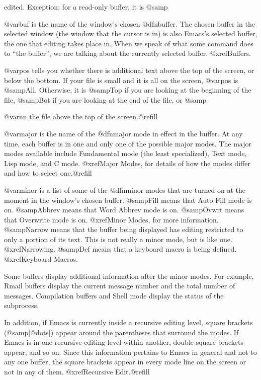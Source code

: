 edited.  Exception: for a read-only buffer, it is @samp{%

  @var{buf} is the name of the window's chosen @dfn{buffer}.  The chosen buffer
in the selected window (the window that the cursor is in) is also Emacs's
selected buffer, the one that editing takes place in.  When we speak of
what some command does to ``the buffer'', we are talking about the
currently selected buffer.  @xref{Buffers}.

  @var{pos} tells you whether there is additional text above the top of the
screen, or below the bottom.  If your file is small and it is all on the
screen, @var{pos} is @samp{All}.  Otherwise, it is @samp{Top} if you are
looking at the beginning of the file, @samp{Bot} if you are looking at the
end of the file, or @samp{@var{nn}%
the file above the top of the screen.@refill

  @var{major} is the name of the @dfn{major mode} in effect in the buffer.  At
any time, each buffer is in one and only one of the possible major modes.
The major modes available include Fundamental mode (the least specialized),
Text mode, Lisp mode, and C mode.  @xref{Major Modes}, for details
of how the modes differ and how to select one.@refill

  @var{minor} is a list of some of the @dfn{minor modes} that are turned on
at the moment in the window's chosen buffer.  @samp{Fill} means that Auto
Fill mode is on.  @samp{Abbrev} means that Word Abbrev mode is on.
@samp{Ovwrt} means that Overwrite mode is on.  @xref{Minor Modes}, for more
information.  @samp{Narrow} means that the buffer being displayed has
editing restricted to only a portion of its text.  This is not really a
minor mode, but is like one.  @xref{Narrowing}.  @samp{Def} means that a
keyboard macro is being defined.  @xref{Keyboard Macros}.

  Some buffers display additional information after the minor modes.  For
example, Rmail buffers display the current message number and the total
number of messages.  Compilation buffers and Shell mode display the status
of the subprocess.

  In addition, if Emacs is currently inside a recursive editing level,
square brackets (@samp{[@dots{}]}) appear around the parentheses that
surround the modes.  If Emacs is in one recursive editing level within
another, double square brackets appear, and so on.  Since this information
pertains to Emacs in general and not to any one buffer, the square brackets
appear in every mode line on the screen or not in any of them.
@xref{Recursive Edit}.@refill

}}
